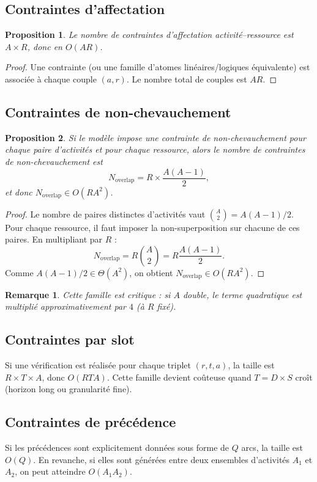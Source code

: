 \documentclass[12pt,a4paper]{article}
\newtheorem{proposition}{Proposition}[section]
\newtheorem{remark}{Remarque}[section]
\begin{document}
\subsection{Contraintes d'affectation}
\begin{proposition}
Le nombre de contraintes d'affectation activité--ressource est $A\times R$, donc en $O(AR)$.
\end{proposition}
\begin{proof}
Une contrainte (ou une famille d'atomes linéaires/logiques équivalente) est associée à chaque couple $(a,r)$. Le nombre total de couples est $AR$.
\end{proof}

\subsection{Contraintes de non-chevauchement}
\begin{proposition}
Si le modèle impose une contrainte de non-chevauchement pour chaque paire d'activités et pour chaque ressource, alors le nombre de contraintes de non-chevauchement est
\begin{equation}
N_{\text{overlap}} = R\times \frac{A(A-1)}{2},
\end{equation}
et donc $N_{\text{overlap}}\in O(RA^2)$.
\end{proposition}
\begin{proof}
Le nombre de paires distinctes d'activités vaut $\binom{A}{2}=A(A-1)/2$. Pour chaque ressource, il faut imposer la non-superposition sur chacune de ces paires. En multipliant par $R$ :
\[
N_{\text{overlap}} = R\binom{A}{2}=R\frac{A(A-1)}{2}.
\]
Comme $A(A-1)/2\in\Theta(A^2)$, on obtient $N_{\text{overlap}}\in O(RA^2)$.
\end{proof}

\begin{remark}
Cette famille est critique : si $A$ double, le terme quadratique est multiplié approximativement par $4$ (à $R$ fixé).
\end{remark}

\subsection{Contraintes par slot}
Si une vérification est réalisée pour chaque triplet $(r,t,a)$, la taille est $R\times T\times A$, donc $O(RTA)$. Cette famille devient coûteuse quand $T=D\times S$ croît (horizon long ou granularité fine).

\subsection{Contraintes de précédence}
Si les précédences sont explicitement données sous forme de $Q$ arcs, la taille est $O(Q)$. En revanche, si elles sont générées entre deux ensembles d'activités $A_1$ et $A_2$, on peut atteindre $O(A_1A_2)$.
\end{document}
